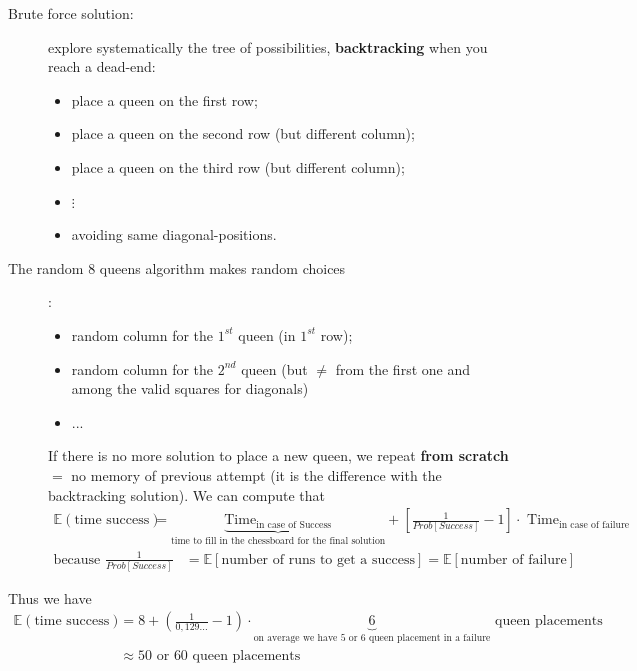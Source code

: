 \documentclass[11pt,a4paper]{scrartcl} %
\theoremstyle{definition}
\newcommand{\E}{\mathbb{E}}
\begin{document}
\begin{description}
\item[Brute force solution: ] explore systematically the tree of possibilities, \textbf{backtracking} when you reach a dead-end:
\begin{itemize}
	\item place a queen on the first row;
	\item place a queen on the second row (but different column);
	\item place a queen on the third row (but different column);
	\item $\vdots$
	\item avoiding same diagonal-positions.
\end{itemize}
\item[The random 8 queens algorithm makes random choices]:\\
\begin{itemize}
	\item random column for the $1^{st}$ queen (in $1^{st}$ row);
	\item random column for the $2^{nd}$ queen (but $\neq$ from the first one and among the valid squares for diagonals)
	\item ...
\end{itemize}
If there is no more solution to place a new queen, we repeat \textbf{from scratch} $=$ no memory of previous attempt (it is the difference with the backtracking solution). We can compute that 
\begin{align*}
\E\left( \text{time success}\right)&=\underbrace{\text{Time}_{\text{in case of Success}}}_{\text{time to fill in the chessboard for the final solution}} + \left[\frac{1}{Prob[Success]}-1\right]\cdot \text{ Time}_{\text{in case of failure}}
\end{align*}
\begin{align*}
\text{because } \frac{1}{Prob[Success]}&=\E\left[\text{number of runs to get a success}\right]=\E\left[\text{number of failure}\right]
\end{align*}
\end{description}

Thus we have
\begin{align*}
\E\left( \text{time success}\right)&=8+(\frac{1}{0,129...}-1)\cdot \underbrace{6}_{\text{on average we have 5 or 6 queen placement in a failure}}\text{ queen placements}\\
&\approx 50\text{ or }60\text{ queen placements}
\end{align*}
\end{document}
